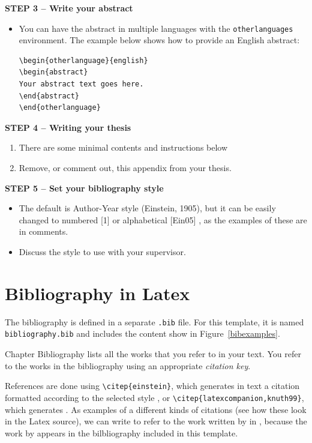 {\textbf{STEP 3 -- Write your abstract}}

\begin{itemize}
\item You can have the abstract in multiple languages with the \texttt{otherlanguages} environment. The example below shows how to provide an English abstract:

\begin{verbatim}
\begin{otherlanguage}{english}
\begin{abstract}
Your abstract text goes here.
\end{abstract}
\end{otherlanguage}
\end{verbatim}

\end{itemize}

{\textbf{STEP 4 -- Writing your thesis}}

\begin{enumerate}
\item There are some minimal contents and instructions below
\item Remove, or comment out, this appendix from your thesis.
\end{enumerate}

{\textbf{STEP 5 -- Set your bibliography style}}

\begin{itemize}
\item The default is Author-Year style (Einstein, 1905), but it can be easily changed to numbered [1] or alphabetical [Ein05] , as the examples of these are in comments.
\item Discuss the style to use with your supervisor.
\end{itemize}

\section{Bibliography in Latex}

The bibliography is defined in a separate \texttt{.bib} file. For this template, it is named \texttt{bibliography.bib} and includes the content show in Figure~\ref{bibexamples}.

Chapter Bibliography lists all the works that you refer to in your text. You refer to the works in the bibliography using an appropriate \emph{citation key}.
%


References are done using \texttt{\textbackslash citep\{einstein\}}, which generates in text a citation formatted according to the selected style \citep{einstein}, or \texttt{\textbackslash citep\{latexcompanion,knuth99\}}, which generates \citep{latexcompanion,knuth99}.
As examples of a different kinds of citations (see how these look in the Latex source), we can write \citep{einstein} to refer to the work written by \citeauthor{einstein} in \citeyear{einstein}, because the work by \citet{einstein} appears in the bilbliography included in this template.

